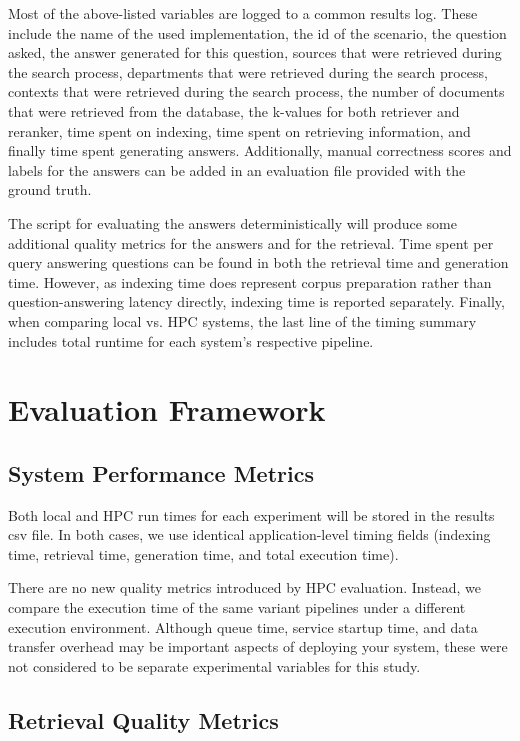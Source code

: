 Most of the above-listed variables are logged to a common results log. These include the name of the used implementation, the id of the scenario, the question asked, the answer generated for this question, sources that were retrieved during the search process, departments that were retrieved during the search process, contexts that were retrieved during the search process, the number of documents that were retrieved from the database, the k-values for both retriever and reranker, time spent on indexing, time spent on retrieving information, and finally time spent generating answers. Additionally, manual correctness scores and labels for the answers can be added in an evaluation file provided with the ground truth.

The script for evaluating the answers deterministically will produce some additional quality metrics for the answers and for the retrieval. Time spent per query answering questions can be found in both the retrieval time and generation time. However, as indexing time does represent corpus preparation rather than question-answering latency directly, indexing time is reported separately. Finally, when comparing local vs. \ac{HPC} systems, the last line of the timing summary includes total runtime for each system's respective pipeline.

\section{Evaluation Framework}

\subsection{System Performance Metrics}

Both local and HPC run times for each experiment will be stored in the results csv file. In both cases, we use identical application-level timing fields (indexing time, retrieval time, generation time, and total execution time).

There are no new quality metrics introduced by \ac{HPC} evaluation. Instead, we compare the execution time of the same variant pipelines under a different execution environment. Although queue time, service startup time, and data transfer overhead may be important aspects of deploying your system, these were not considered to be separate experimental variables for this study.

\subsection{Retrieval Quality Metrics}

